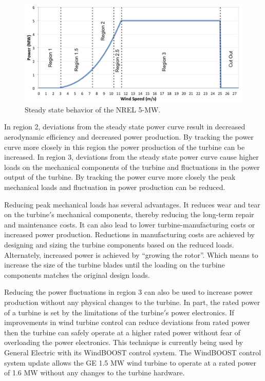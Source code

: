 \begin{figure}[htbp]
	\centering
		\includegraphics[width=\linewidth]{Figures/ch1Figures/fig1-6.png}
	\caption{Steady state behavior of the NREL 5-MW.\cite{jonkman2009}}
	\label{fig1-6}
\end{figure}

In region 2, deviations from the steady state power curve result in decreased aerodynamic efficiency and decreased power production.  By tracking the power curve more closely in this region the power production of the turbine can be increased. In region 3, deviations from the steady state power curve cause higher loads on the mechanical components of the turbine and fluctuations in the power output of the turbine.  By tracking the power curve more closely the peak mechanical loads and fluctuation in power production can be reduced.

Reducing peak mechanical loads has several advantages.  It reduces wear and tear on the turbine$'$s mechanical components, thereby reducing the long-term repair and maintenance costs.  It can also lead to lower turbine-manufacturing costs or increased power production.  Reductions in manufacturing costs are achieved by designing and sizing the turbine components based on the reduced loads.  Alternately, increased power is achieved by ``growing the rotor''.  Which means to increase the size of the turbine blades until the loading on the turbine components matches the original design loads.

Reducing the power fluctuations in region 3 can also be used to increase power production without any physical changes to the turbine.  In part, the rated power of a turbine is set by the limitations of the turbine$'$s power electronics.  If improvements in wind turbine control can reduce deviations from rated power then the turbine can safely operate at a higher rated power without fear of overloading the power electronics.  This technique is currently being used by General Electric with its WindBOOST control system. The WindBOOST control system update allows the GE 1.5 MW wind turbine to operate at a rated power of 1.6 MW without any changes to the turbine hardware.\cite{GE2009}



